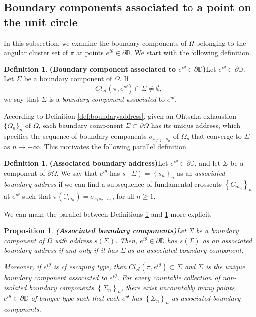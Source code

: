 \documentclass[11pt,a4paper,reqno]{amsart}
\theoremstyle{plain}
\newtheorem{prop}[thm]{Proposition}
\theoremstyle{definition}
\newtheorem{defi}[thm]{Definition}
\theoremstyle{plain}
\def\DD{\mathbb{D}}
\begin{document}
\subsection{Boundary components associated to a point on the unit circle}\label{ssec:association}
In this subsection, we examine the boundary components of $\Omega$ belonging to the angular cluster set of $\pi$ at points $e^{i\theta}\in\partial\DD$. We start with the following definition.
\begin{defi}{\bf (Boundary component associated to $ e^{i\theta}\in\partial \mathbb{D} $)}\label{def:associatedcomponent}
	Let $ e^{i\theta}\in\partial \mathbb{D} $. Let $ \Sigma $ be a boundary component of $ \Omega $. If \[ Cl_{\mathcal{A}}(\pi, e^{i\theta})\cap \Sigma\neq\emptyset, \] we say that $ \Sigma $ is a {\em boundary component associated} to $ e^{i\theta}$.
\end{defi}
According to Definition \ref{def:boundaryaddress}, given an Ohtsuka exhaustion $\{\Omega_n\}_n$ of $ \Omega $, each boundary component $\Sigma\subset\partial\Omega$ has its unique address, which specifies the sequence of boundary components $\sigma_{s_1s_2\dots s_n}$ of $\Omega_n$ that converge to $\Sigma$ as $n\to+\infty$. This motivates the following parallel definition.
\begin{defi}{\bf (Associated boundary address)}\label{def:associatedaddress}
Let $e^{i\theta}\in\partial\DD$, and let $\Sigma$ be a component of $\partial\Omega$. We say that $e^{i\theta}$ has $\underline{s}(\Sigma) = \left\lbrace s_n\right\rbrace _n$ as an \textit{associated boundary address} if we can find a subsequence of fundamental crosscuts $\left\lbrace C_{m_n}\right\rbrace _n$ at $e^{i\theta}$ such that $\pi(C_{m_n}) = \sigma_{s_1s_2\dots s_n}$, for all $n\geq 1$.
\end{defi}
We can make the parallel between Definitions \ref{def:associatedcomponent} and \ref{def:associatedaddress} more explicit.
\begin{prop}{\bf (Associated boundary components)}\label{prop-associated-boundary-comp}
Let $ \Sigma $ be a boundary component of $ \Omega $ with address $ \underline{s} (\Sigma)$.
Then,	$ e^{i\theta} \in\partial\mathbb{D}$ has $ \underline{s} (\Sigma)$ as an associated boundary address if and only if it has $\Sigma$ as an associated boundary component. 

\noindent Moreover, if $ e^{i\theta} $ is of escaping type, then $  Cl_{\mathcal{A}}(\pi, e^{i\theta})\subset\Sigma$ and $ \Sigma $ is the unique boundary component associated to $ e^{i\theta}$. For every countable collection of non-isolated boundary components $ \left\lbrace \Sigma_n \right\rbrace _n$, there exist uncountably many points $ e^{i\theta}\in\partial\mathbb{D} $ of bungee type such that each $e^{i\theta}$ has $ \left\lbrace \Sigma_n \right\rbrace _n$ as associated boundary components.
\end{prop}
\end{document}
